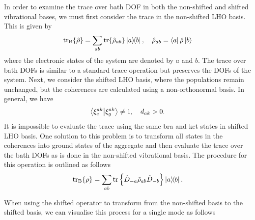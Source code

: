 In order to examine the trace over bath DOF in both the non-shifted and shifted vibrational bases, we must first consider the trace in the non-shifted LHO basis. This is given by
\begin{equation}
    \operatorname{tr}_{\mathrm{B}} \{ \hat{\rho}\} = \sum_{ab} \operatorname{tr} \{ \hat{\rho}_{ab}\} \ketbra{a}{b}, \quad \hat{\rho}_{ab} = \bra{a} \hat{\rho} \ket{b}
\end{equation}
where the electronic states of the system are denoted by $a$ and $b$. The trace over bath DOFs is similar to a standard trace operation but preserves the DOFs of the system. Next, we consider the shifted LHO basis, where the populations remain unchanged, but the coherences are calculated using a non-orthonormal basis. In general, we have
\begin{equation}
    \braket{\xi^{ak}_e}{\xi^{ak}_g} \neq 1, \quad d_{ak} > 0.
\end{equation}
It is impossible to evaluate the trace using the same bra and ket states in shifted LHO basis. One solution to this problem is to transform all states in the coherences into ground states of the aggregate and then evaluate the trace over the bath DOFs as is done in the non-shifted vibrational basis. The procedure for this operation is outlined as follows
\begin{equation}
    \operatorname{tr}_{\mathrm{B}} \{ \rho\} = \sum_{ab} \operatorname{tr}\Big\{ \hat{D}_{-a} \hat{\rho}_{ab} \hat{D}_{-b} \Big\} \ketbra{a}{b}.
\end{equation}

When using the shifted operator to transform from the non-shifted basis to the shifted basis, we can visualise this process for a single mode as follows



